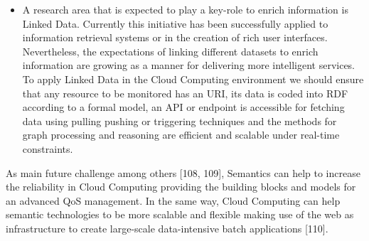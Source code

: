 \begin{itemize}
 \item A research area that is expected to play a key-role to enrich information 
is Linked Data. Currently this initiative has been successfully applied to 
information retrieval systems or in the creation of rich user interfaces. 
Nevertheless, the expectations of linking different datasets to enrich 
information are growing as a manner for delivering more intelligent services. To 
apply Linked Data in the Cloud Computing environment we should ensure that any 
resource to be monitored has an URI, its data is coded into RDF according to a 
formal model, an API or endpoint is accessible for fetching data using pulling 
pushing or triggering techniques and the methods for graph processing and 
reasoning are efficient and scalable under real-time constraints.
 
\end{itemize}

As main future challenge among others [108, 109], Semantics can help to increase 
the reliability in Cloud Computing providing the building blocks and models for 
an advanced QoS management. In the same way, Cloud Computing can help semantic 
technologies to be more scalable and flexible making use of the web as 
infrastructure to create large-scale data-intensive batch applications [110].


